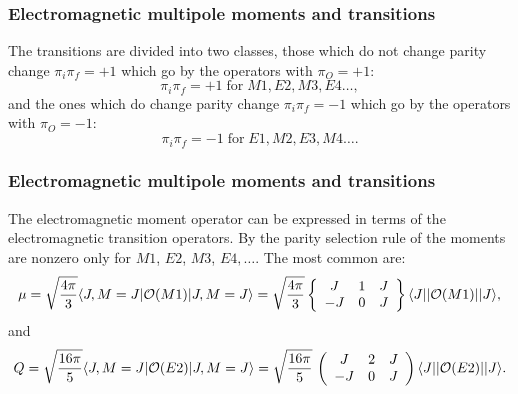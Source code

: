 \documentclass{beamer}
\begin{document}
\begin{frame}
\frametitle{Electromagnetic multipole moments and transitions}

\begin{block}{}
The transitions are divided into two classes, those
which do not change parity change $\pi _{i}\pi _{f}=+1$ which go by the
operators with $\pi _{O}=+1$:
\[
\pi _{i}\pi _{f}=+1 \; \mathrm{for} \; M1, E2, M3, E4 \dots,
\]
and the ones which do change parity change $\pi _{i}\pi _{f}=-1$
which go by the operators with $\pi _{O}=-1$:
\[
\pi _{i}\pi _{f}=-1 \; \mathrm{for} \; E1, M2, E3, M4 \dots.
\]

\end{block}
\end{frame}

\begin{frame}
\frametitle{Electromagnetic multipole moments and transitions}

\begin{block}{}
The 
electromagnetic moment operator can be expressed in terms of the
electromagnetic transition operators.
By the parity selection rule of the moments are nonzero
only for $M1$, $E2$, $M3$, $E4,\ldots$.
The most common are:
\[
\mu =\sqrt{\frac{4\pi }{3}}\langle J,M=J\vert {\cal O}(M1)\vert J,M=J\rangle= \sqrt{\frac{4\pi }{3}}\left\{\begin{array}{ccc} J & 1 &J \\  -J &  0 &  J \end{array}\right\}
\langle J\vert \vert {\cal O}(M1)\vert \vert J\rangle,
\]
and
\[
Q = \sqrt{\frac{16\pi }{5}}\langle J,M=J\vert {\cal O}(E2)\vert J,M=J\rangle= \sqrt{\frac{16\pi }{5}}\,
  \left(\begin{array}{ccc}  {J}&  {2} & {J}\\  {-J} & {0}&  {J}\end{array}\right)\langle J\vert\vert {\cal O}(E2)\vert\vert J\rangle.
\]
\end{block}
\end{frame}
\end{document}
